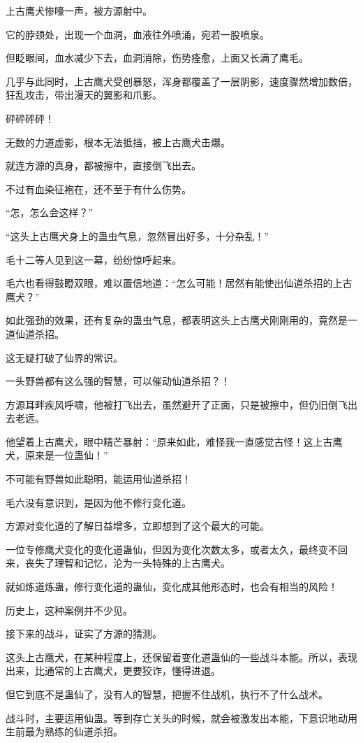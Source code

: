 \begin{this_body}
上古鹰犬惨嚎一声，被方源射中。

它的脖颈处，出现一个血洞，血液往外喷涌，宛若一股喷泉。

但眨眼间，血水减少下去，血洞消除，伤势痊愈，上面又长满了鹰毛。

几乎与此同时，上古鹰犬受创暴怒，浑身都覆盖了一层阴影，速度骤然增加数倍，狂乱攻击，带出漫天的翼影和爪影。

砰砰砰砰！

无数的力道虚影，根本无法抵挡，被上古鹰犬击爆。

就连方源的真身，都被擦中，直接倒飞出去。

不过有血染征袍在，还不至于有什么伤势。

“怎，怎么会这样？”

“这头上古鹰犬身上的蛊虫气息，忽然冒出好多，十分杂乱！”

毛十二等人见到这一幕，纷纷惊呼起来。

毛六也看得鼓瞪双眼，难以置信地道：“怎么可能！居然有能使出仙道杀招的上古鹰犬？”

如此强劲的效果，还有复杂的蛊虫气息，都表明这头上古鹰犬刚刚用的，竟然是一道仙道杀招。

这无疑打破了仙界的常识。

一头野兽都有这么强的智慧，可以催动仙道杀招？！

方源耳畔疾风呼啸，他被打飞出去，虽然避开了正面，只是被擦中，但仍旧倒飞出去老远。

他望着上古鹰犬，眼中精芒暴射：“原来如此，难怪我一直感觉古怪！这上古鹰犬，原来是一位蛊仙！”

不可能有野兽如此聪明，能运用仙道杀招！

毛六没有意识到，是因为他不修行变化道。

方源对变化道的了解日益增多，立即想到了这个最大的可能。

一位专修鹰犬变化的变化道蛊仙，但因为变化次数太多，或者太久，最终变不回来，丧失了理智和记忆，沦为一头特殊的上古鹰犬。

就如炼道炼蛊，修行变化道的蛊仙，变化成其他形态时，也会有相当的风险！

历史上，这种案例并不少见。

接下来的战斗，证实了方源的猜测。

这头上古鹰犬，在某种程度上，还保留着变化道蛊仙的一些战斗本能。所以，表现出来，比通常的上古鹰犬，更要狡诈，懂得进退。

但它到底不是蛊仙了，没有人的智慧，把握不住战机，执行不了什么战术。

战斗时，主要运用仙蛊。等到存亡关头的时候，就会被激发出本能，下意识地动用生前最为熟练的仙道杀招。


\end{this_body}

